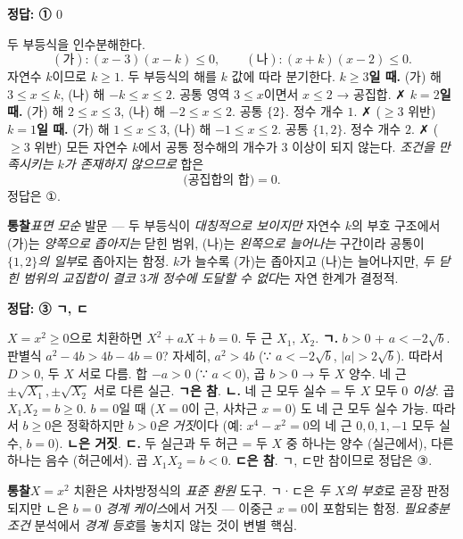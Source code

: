 \documentclass[10pt]{article}
\newcommand{\solnote}[1]{\par\smallskip\noindent
  \begin{tcolorbox}[enhanced, breakable, colback=vB-light, colframe=vB-light,
    boxrule=0pt, arc=3pt, left=10pt, right=10pt, top=4pt, bottom=4pt,
    fontupper=\sffamily\footnotesize\color{vB-ink}]
    \textbf{\color{vB-deep}통찰}\quad #1
  \end{tcolorbox}}
\begin{document}
\begin{answerbox}\sffamily\bfseries 정답: ① $0$\end{answerbox}
 두 부등식을 인수분해한다.
\[ (\text{가}): (x - 3)(x - k) \le 0, \qquad (\text{나}): (x + k)(x - 2) \le 0. \]
 자연수 $k$이므로 $k \ge 1$. 두 부등식의 해를 $k$ 값에 따라 분기한다.
 \textbf{$k \ge 3$일 때.} (가) 해 $3 \le x \le k$, (나) 해 $-k \le x \le 2$. 공통 영역 $3 \le x$이면서 $x \le 2$ → 공집합. ✗
 \textbf{$k = 2$일 때.} (가) 해 $2 \le x \le 3$, (나) 해 $-2 \le x \le 2$. 공통 $\{2\}$. 정수 개수 $1$. ✗ ($\ge 3$ 위반)
 \textbf{$k = 1$일 때.} (가) 해 $1 \le x \le 3$, (나) 해 $-1 \le x \le 2$. 공통 $\{1, 2\}$. 정수 개수 $2$. ✗ ($\ge 3$ 위반)
 모든 자연수 $k$에서 공통 정수해의 개수가 $3$ 이상이 되지 않는다. \emph{조건을 만족시키는 $k$가 존재하지 않으므로} 합은
\[ \text{(공집합의 합)} = 0. \]
정답은 $\textbf{①}$.
\solnote{\emph{표면 모순} 발문 — 두 부등식이 \emph{대칭적으로 보이지만} 자연수 $k$의 부호 구조에서 (가)는 \emph{양쪽으로 좁아지는} 닫힌 범위, (나)는 \emph{왼쪽으로 늘어나는} 구간이라 공통이 \emph{$\{1, 2\}$의 일부}로 좁아지는 함정. $k$가 늘수록 (가)는 좁아지고 (나)는 늘어나지만, \emph{두 닫힌 범위의 교집합이 결코 $3$개 정수에 도달할 수 없다}는 자연 한계가 결정적.}

\begin{answerbox}\sffamily\bfseries 정답: ③ ㄱ, ㄷ\end{answerbox}
 $X = x^2 \ge 0$으로 치환하면 $X^2 + aX + b = 0$. 두 근 $X_1$, $X_2$.
 \textbf{ㄱ.} $b > 0$ + $a < -2\sqrt{b}$. 판별식 $a^2 - 4b > 4b - 4b = 0$? 자세히, $a^2 > 4b$ (∵ $a < -2\sqrt{b}$, $|a| > 2\sqrt{b}$). 따라서 $D > 0$, 두 $X$ 서로 다름. 합 $-a > 0$ (∵ $a < 0$), 곱 $b > 0$ → 두 $X$ 양수. 네 근 $\pm\sqrt{X_1}, \pm\sqrt{X_2}$ 서로 다른 실근. \textbf{ㄱ은 참}.
 \textbf{ㄴ.} 네 근 모두 실수 = 두 $X$ 모두 \emph{$0$ 이상}. 곱 $X_1 X_2 = b \ge 0$. $b = 0$일 때 ($X = 0$이 근, 사차근 $x = 0$) 도 네 근 모두 실수 가능. 따라서 $b \ge 0$은 정확하지만 \emph{$b > 0$은 거짓}이다 (예: $x^4 - x^2 = 0$의 네 근 $0, 0, 1, -1$ 모두 실수, $b = 0$). \textbf{ㄴ은 거짓}.
 \textbf{ㄷ.} 두 실근과 두 허근 = 두 $X$ 중 하나는 양수 (실근에서), 다른 하나는 음수 (허근에서). 곱 $X_1 X_2 = b < 0$. \textbf{ㄷ은 참}.
 ㄱ, ㄷ만 참이므로 정답은 $\textbf{③}$.
\solnote{$X = x^2$ 치환은 사차방정식의 \emph{표준 환원} 도구. ㄱ·ㄷ은 \emph{두 $X$의 부호}로 곧장 판정되지만 ㄴ은 \emph{$b = 0$ 경계 케이스}에서 거짓 — 이중근 $x = 0$이 포함되는 함정. \emph{필요충분조건} 분석에서 \emph{경계 등호}를 놓치지 않는 것이 변별 핵심.}
\end{document}

